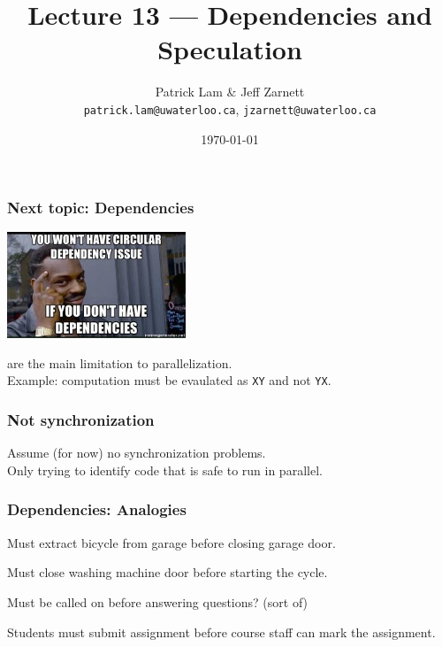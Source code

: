 
\usepackage{multirow}

\title{Lecture 13 --- Dependencies and Speculation }

\author{Patrick Lam \& Jeff Zarnett \\ \small \texttt{patrick.lam@uwaterloo.ca}, \texttt{jzarnett@uwaterloo.ca}}
\date{\today}




\begin{frame}
  \titlepage

 \end{frame}

\begin{frame}
  \frametitle{Next topic: Dependencies}

\begin{center}
	\includegraphics[width=0.4\textwidth]{images/dependency.jpeg}
\end{center}

      are the main
      limitation to parallelization.\\[1em]
     Example: computation must be evaulated as {\tt XY} and not {\tt YX}.\\[1em]
  
\end{frame}

\begin{frame}
  \frametitle{Not synchronization}

  
      Assume (for now) no synchronization problems.\\[1em]
      Only trying to identify code that is safe to run in
      parallel.

  
\end{frame}

\begin{frame}
\frametitle{Dependencies: Analogies}

Must extract bicycle from garage before closing garage door.

Must close washing machine door before starting the cycle.

Must be called on before answering questions? (sort of)

Students must submit assignment before course staff can mark the assignment.

\end{frame}


